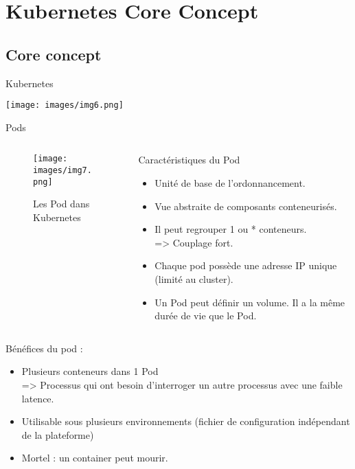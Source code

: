 \documentclass{bredelebeamer}
\begin{document}
\section{Kubernetes  Core Concept}
\subsection{Core concept}

\begin{frame}{Kubernetes}
\begin{center}
\texttt{[image: images/img6.png]}
\end{center}
\end{frame}

\begin{frame}{Pods}

\begin{columns}
\begin{column}{0.5\textwidth}
\begin{figure}
\centering
\texttt{[image: images/img7.png]}
\caption{Les Pod dans Kubernetes}
\end{figure}
\end{column}
\begin{column}{0.5\textwidth}
\begin{block}{Caractéristiques du Pod}

\begin{itemize}
\item Unité de base de l'ordonnancement. 											\pause
\item Vue abstraite de composants conteneurisés.								\pause
\item Il peut regrouper 1 ou * conteneurs. \\=> Couplage fort.				\pause
\item Chaque pod possède une adresse IP unique (limité au cluster).		\pause
\item Un Pod peut définir un volume. 
		Il a la même durée de vie que le Pod.
\end{itemize}
\end{block}																							\pause
\end{column}



\end{columns}
\vspace{4px}
Bénéfices du pod : 
\begin{itemize}
\item Plusieurs conteneurs dans 1 Pod\\
=> Processus qui ont besoin d'interroger un autre processus avec une faible latence.		\pause
\item Utilisable sous plusieurs environnements (fichier de configuration indépendant de la plateforme)		\pause
\item Mortel : un container peut mourir.		\pause
\end{itemize}
\end{frame}
\end{document}
